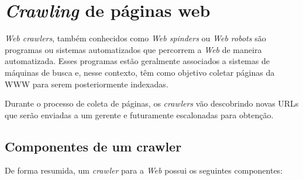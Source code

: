 \documentclass[10pt,twocolumn]{article}
\begin{document}
\section{\emph{Crawling} de páginas web}

\emph{Web crawlers}, também conhecidos como \emph{Web spinders} ou
\emph{Web robots} são programas ou sistemas automatizados que percorrem
a \emph{Web} de maneira automatizada. Esses programas estão geralmente
associados a sistemas de máquinas de busca e, nesse contexto, têm como
objetivo coletar páginas da WWW para serem posteriormente indexadas.

Durante o processo de coleta de páginas, os \emph{crawlers} vão
descobrindo novas URLs que serão enviadas a um gerente e futuramente
escalonadas para obtenção.

\subsection{Componentes de um crawler}\label{sec:components}

De forma resumida, um \emph{crawler} para a \emph{Web} possui os
seguintes componentes:
\end{document}
